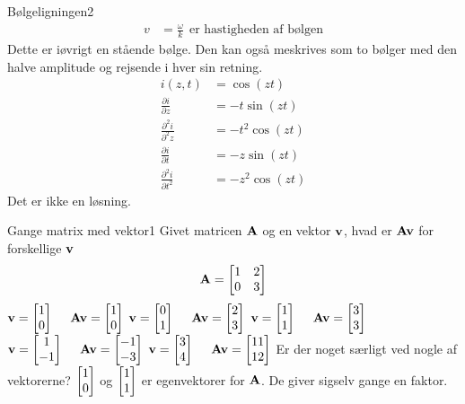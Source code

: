 \begin{opgave}{Bølgeligningen}{2}
\begin{align*}
v &= \frac{\omega}{k}~~\text{er hastigheden af bølgen}
\end{align*}
Dette er iøvrigt en stående bølge. Den kan også meskrives som to bølger med den halve amplitude og rejsende i hver sin retning.
\opg
\begin{align*}
i(z,t) &= \cos(zt)\\
\frac{\partial i}{\partial z} &= -t\sin(zt)\\
\frac{\partial^2 i}{\partial^2 z} &= -t^2\cos(zt)\\
\frac{\partial i}{\partial t} &= -z\sin(zt)\\
\frac{\partial^2 i}{\partial t^2} &= -z^2\cos(zt)
\end{align*}
Det er ikke en løsning.
\end{opgave}

\begin{opgave}{Gange matrix med vektor}{1}
Givet matricen $\mathbf{A}$ og en vektor $\mathbf{v}$, hvad er $\mathbf{A}\mathbf{v}$ for forskellige $\mathbf{v}$
$$
\mathbf{A} = \begin{bmatrix}
1&2\\0&3
\end{bmatrix}
$$
\opg $\mathbf{v} = \begin{bmatrix} 1 \\ 0 \end{bmatrix}~~~~\mathbf{A}\mathbf{v}  = \begin{bmatrix} 1 \\ 0 \end{bmatrix}$
\opg $\mathbf{v} = \begin{bmatrix} 0 \\ 1 \end{bmatrix}~~~~\mathbf{A}\mathbf{v}  = \begin{bmatrix} 2 \\ 3 \end{bmatrix}$
\opg $\mathbf{v} = \begin{bmatrix} 1 \\ 1 \end{bmatrix}~~~~\mathbf{A}\mathbf{v}  = \begin{bmatrix} 3 \\ 3 \end{bmatrix}$
\opg $\mathbf{v} = \begin{bmatrix} 1 \\ -1 \end{bmatrix}~~~~\mathbf{A}\mathbf{v}  = \begin{bmatrix} -1 \\ -3 \end{bmatrix}$
\opg $\mathbf{v} = \begin{bmatrix} 3 \\ 4 \end{bmatrix}~~~~\mathbf{A}\mathbf{v}  = \begin{bmatrix} 11 \\ 12 \end{bmatrix}$
\opg Er der noget særligt ved nogle af vektorerne? $\begin{bmatrix} 1 \\ 0 \end{bmatrix}$ og $\begin{bmatrix} 1 \\ 1 \end{bmatrix}$ er egenvektorer for $\mathbf{A}$. De giver sigselv gange en faktor.
\end{opgave}


